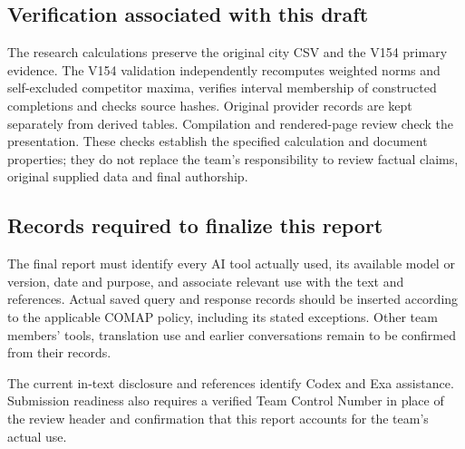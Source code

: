 \subsection*{Verification associated with this draft}
The research calculations preserve the original city CSV and the V154 primary
evidence. The V154 validation independently recomputes weighted norms and
self-excluded competitor maxima, verifies interval membership of constructed
completions and checks source hashes. Original provider records are kept
separately from derived tables. Compilation and rendered-page review check the
presentation. These checks establish the specified calculation and document
properties; they do not replace the team's responsibility to review factual
claims, original supplied data and final authorship.

\subsection*{Records required to finalize this report}
The final report must identify every AI tool actually used, its available
model or version, date and purpose, and associate relevant use with the text
and references. Actual saved query and response records should be inserted
according to the applicable COMAP policy, including its stated exceptions.
Other team members' tools, translation use and earlier conversations remain
to be confirmed from their records.

The current in-text disclosure and references identify Codex and Exa
assistance. Submission readiness also requires a verified Team Control Number
in place of the review header and confirmation that this report accounts for
the team's actual use.
